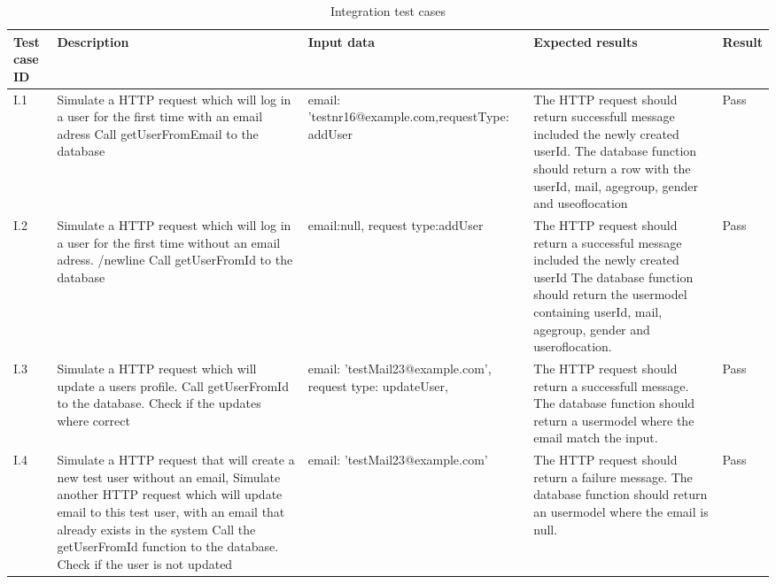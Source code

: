 \begin{appendices}
\begin{center}
\begin{longtable}{ | p{1cm} | p{5.5cm} | p{4cm} | p{4.5cm} | p{2cm}|}
		\caption[Integration test cases]{Integration test cases} \label{Tab:integrationtestcases}\\
		\hline
		\textbf{Test case ID} & \textbf{Description} & \textbf{Input data} & \textbf{Expected results} & \textbf{Result} \\ \hline
		
		I.1 & Simulate a HTTP request which will log in a user for the first time with an email adress \newline Call getUserFromEmail to the database & email: 'testnr16@example.com,\newline requestType: addUser & The HTTP request should return successfull message included the newly created userId. The database  function should return a row with the userId, mail, age\textunderscore group, gender and use\textunderscore of\textunderscore location  & Pass \\ \hline
		
		I.2 & Simulate a HTTP request which will log in a user for the first time without an email adress. /newline Call getUserFromId to the database & email:null, \newline request type:addUser  & The HTTP request should return a successful message included the newly created userId The database function should return the usermodel containing userId, mail, age\textunderscore group, gender and user\textunderscore of\textunderscore location.  & Pass \\ \hline
		
		I.3 & Simulate a HTTP request which will update a users profile. \newline Call getUserFromId to the database.  \newline Check if the updates where correct & email: 'testMail23@example.com', request type: updateUser,  & The HTTP request should return a successfull message. The database function should return a usermodel where the email match the input.& Pass\\ \hline
		
		I.4 & Simulate a HTTP request that will create a new test user without an email, Simulate another HTTP request which will update email to this test user, with an email that already exists in the system \newline  Call the getUserFromId function to the database. \newline Check if the user is not updated & email: 'testMail23@example.com' & The HTTP request should return a failure message. The database function should return an usermodel where the email is null. & Pass\\ \hline
		

\end{longtable}
\end{center}
\end{appendices}
